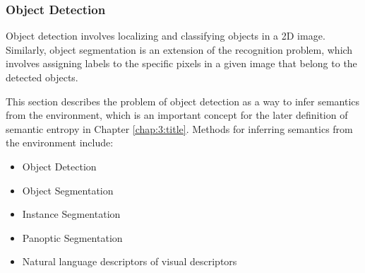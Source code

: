 





\subsubsection{Object Detection}
Object detection involves localizing and classifying objects in a 2D image. Similarly, object segmentation is an extension of the recognition problem, which involves assigning labels to the specific pixels in a given image that belong to the detected objects. 

This section describes the problem of object detection as a way to infer semantics from the environment, which is an important concept for the later definition of semantic entropy in Chapter \ref{chap:3:title}. Methods for inferring semantics from the environment include:
\begin{itemize}
    \item Object Detection
    \item Object Segmentation
    \item Instance Segmentation
    \item Panoptic Segmentation
    \item Natural language descriptors of visual descriptors
\end{itemize}

